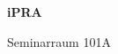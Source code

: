 \documentclass[a4paper]{article}
\begin{document}
\printGenericVSLHeader
\begin{center}
\begin{vsltext}{3cm}{4cm}

   \vspace{0.5cm} 

    \textbf{iPRA} 

    \vspace{1.5cm}

    Seminarraum 101A

\end{vsltext}

\end{center}
\end{document}
